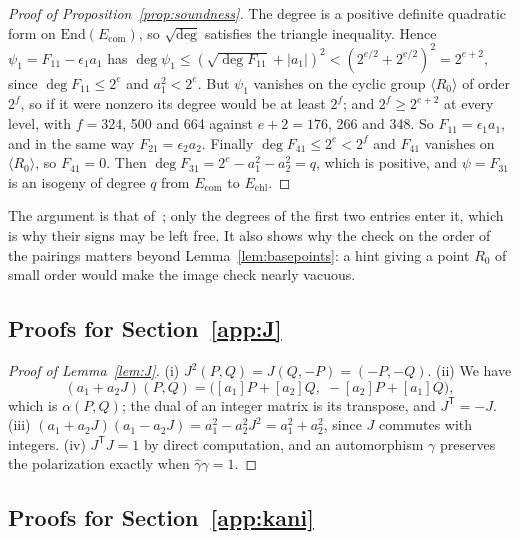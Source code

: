 \documentclass[version=preprint]{iacrcc}
\newcommand{\Ecom}{E_{\mathrm{com}}}
\newcommand{\Echl}{E_{\mathrm{chl}}}
\begin{document}
\begin{proof}[Proof of Proposition~\ref{prop:soundness}]
        The degree is a positive definite quadratic form on $\mathrm{End}(\Ecom)$,
        so $\sqrt{\deg}$ satisfies the triangle inequality. Hence $\psi_1 =
        F_{11} - \epsilon_1 a_1$ has $\deg \psi_1 \le (\sqrt{\deg F_{11}} +
        |a_1|)^2 < (2^{e/2} + 2^{e/2})^2 = 2^{e + 2}$, since $\deg F_{11} \le
        2^e$ and $a_1^2 < 2^e$. But $\psi_1$ vanishes on the cyclic group
        $\langle R_0 \rangle$ of order $2^f$, so if it were nonzero its degree
        would be at least $2^f$; and $2^f \ge 2^{e + 2}$ at every level, with
        $f = 324$, 500 and 664 against $e + 2 = 176$, 266 and 348. So $F_{11} =
        \epsilon_1 a_1$, and in the same way $F_{21} = \epsilon_2 a_2$. Finally
        $\deg F_{41} \le 2^e < 2^f$ and $F_{41}$ vanishes on $\langle R_0
        \rangle$, so $F_{41} = 0$. Then $\deg F_{31} = 2^e - a_1^2 - a_2^2 =
        q$, which is positive, and $\psi = F_{31}$ is an isogeny of degree $q$
        from $\Ecom$ to $\Echl$.
    \end{proof}

    The argument is that of~\cite[Appendix E.5]{DLRW24}; only the degrees of
    the first two entries enter it, which is why their signs may be left
    free. It also shows why the check on the order of the pairings matters
    beyond Lemma~\ref{lem:basepoints}: a hint giving a point $R_0$ of small
    order would make the image check nearly vacuous.

    \subsection*{Proofs for Section~\ref{app:J}}

    \begin{proof}[Proof of Lemma~\ref{lem:J}]
        (i) $J^2(P, Q) = J(Q, -P) = (-P, -Q)$. (ii) We have
        \[
        (a_1 + a_2 J)(P, Q) = \bigl([a_1]P + [a_2]Q, \; -[a_2]P + [a_1]Q\bigr),
        \]
        which is $\alpha(P, Q)$; the dual
        of an integer matrix is its transpose, and $J^{\mathsf{T}} = -J$. (iii)
        $(a_1 + a_2 J)(a_1 - a_2 J) = a_1^2 - a_2^2 J^2 = a_1^2 + a_2^2$, since
        $J$ commutes with integers. (iv) $J^{\mathsf{T}} J = 1$ by direct
        computation, and an automorphism $\gamma$ preserves the polarization
        exactly when $\widehat{\gamma}\gamma = 1$.
    \end{proof}

    \subsection*{Proofs for Section~\ref{app:kani}}
\end{document}
